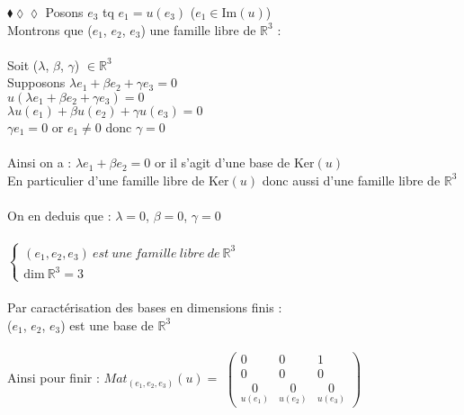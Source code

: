 \documentclass[11pt]{article}
\newcommand*{\R}{\mathbb{R}}
\newcommand{\dim}[1]{\textrm{dim}~#1}
\renewcommand*{\ker}[1]{\textrm{Ker}(#1)}
\renewcommand{\Im}[1]{\textrm{Im}(#1)}
\begin{document}
\begin{exercise}{$\blacklozenge\lozenge\lozenge$}{}
    Posons $e_{3}$ tq $e_{1} = u{(e_{3})}$ ($e_{1} \in \Im{u}$)\\
    Montrons que ($e_{1}$, $e_{2}$, $e_{3}$) une famille libre de $\R^{3}$ : \\\\
    Soit ($\lambda$, $\beta$, $\gamma$) $\in \R^{3}$\\
    Supposons $\lambda e_{1} + \beta e_{2} + \gamma e_{3} = 0$\\
    $u{(\lambda e_{1} + \beta e_{2} + \gamma e_{3})} = 0$ \\
    $\lambda u{(e_{1})} + \beta u{(e_{2})} + \gamma u{(e_{3})} = 0$ \\
    $\gamma e_{1} = 0$ or $e_{1} \neq 0$ donc $\gamma = 0$\\\\
    Ainsi on a : $\lambda e_{1} + \beta e_{2} = 0$ or il s'agit d'une base de $\ker{u}$\\
    En particulier d'une famille libre de $\ker{u}$ donc aussi d'une famille libre de $\R^{3}$\\\\
    On en deduis que : $\lambda = 0$, $\beta = 0$, $\gamma = 0$\\\\
    $\left\{
        \begin{array}{ll}
            (e_{1}, e_{2}, e_{3})~est~une~famille~libre~de~\R^{3} \\
            \dim{\R^{3}} = 3
        \end{array}
    \right.$\\\\
    Par caractérisation des bases en dimensions finis :\\
    ($e_{1}$, $e_{2}$, $e_{3}$) est une base de $\R^{3}$\\\\
    Ainsi pour finir : $Mat_{(e_{1}, e_{2}, e_{3})}(u) = $ 
    $\begin{pmatrix}
            0 & 0 & 1 \\
            0 & 0 & 0 \\
            \underset{u{(e_{1})}}{0} & \underset{u{(e_{2})}}{0} & \underset{u{(e_{3})}}{0}
    \end{pmatrix}$\\
\end{exercise}
\end{document}
